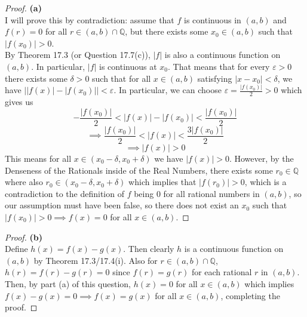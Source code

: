 \documentclass[10pt,a4paper]{article}
\theoremstyle{definition}
\begin{document}
\begin{proof}{\textbf{(a)}}
\\I will prove this by contradiction: assume that $f$ is continuous in $(a,b)$ and $f(r) = 0$ for all $r \in (a,b) \cap \mathbb{Q}$, but there exists some $x_0 \in (a,b)$ such that $|f(x_0)| > 0$.
\\By Theorem 17.3 (or Question 17.7(c)), $|f|$ is also a continuous function on $(a,b)$. In particular, $|f|$ is continuous at $x_0$. That means that for every $\varepsilon > 0$ there exists some $\delta > 0$ such that for all $x \in (a,b)$ satisfying $|x - x_0| < \delta$, we have $\big||f(x)| - |f(x_0)|\big| < \varepsilon$. In particular, we can choose $\varepsilon = \frac{|f(x_0)|}{2} > 0$ which gives us
\[-\frac{|f(x_0)|}{2} < |f(x)| - |f(x_0)| < \frac{|f(x_0)|}{2}\]
\[\implies \frac{|f(x_0)|}{2} < |f(x)| < \frac{3|f(x_0)|}{2}\]
\[\implies |f(x)| > 0\]
This means for all $x \in (x_0 - \delta, x_0 + \delta)$ we have $|f(x)| > 0$. However, by the Denseness of the Rationals inside of the Real Numbers, there exists some $r_0 \in \mathbb{Q}$ where also $r_0 \in (x_0 - \delta, x_0 + \delta)$ which implies that $|f(r_0)| > 0$, which is a contradiction to the definition of $f$ being 0 for all rational numbers in $(a,b)$, so our assumption must have been false, so there does not exist an $x_0$ such that $|f(x_0)| > 0 \implies f(x) = 0$ for all $x \in (a,b)$.
\end{proof}

\begin{proof}{\textbf{(b)}}
\\Define $h(x) = f(x) - g(x)$. Then clearly $h$ is a continuous function on $(a,b)$ by Theorem 17.3/17.4(i). Also for $r \in (a,b) \cap \mathbb{Q}$, $h(r) = f(r) - g(r) = 0$ since $f(r) = g(r)$ for each rational $r$ in $(a,b)$. Then, by part (a) of this question, $h(x) = 0$ for all $x \in (a,b)$ which implies $f(x) - g(x) = 0 \implies f(x) = g(x)$ for all $x \in (a,b)$, completing the proof. 
\end{proof}
\end{document}
